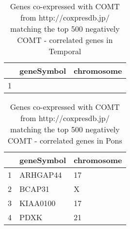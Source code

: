 \documentclass[letterpaper,12pt]{article}
\numberwithin{equation}{appendix}
\begin{document}
{{\clearpage
\begin{table}[ht]
\centering
\begin{tabular}{rll}
  \hline
 & geneSymbol & chromosome \\ 
  \hline
1 &  &  \\ 
   \hline
\end{tabular}
\caption{Genes co-expressed with COMT from http://coxpresdb.jp/ matching the top 500 negatively COMT - correlated genes in Temporal} 
\end{table}

\clearpage
\begin{table}[ht]
\centering
\begin{tabular}{rll}
  \hline
 & geneSymbol & chromosome \\ 
  \hline
1 & ARHGAP44 & 17 \\ 
  2 & BCAP31 & X \\ 
  3 & KIAA0100 & 17 \\ 
  4 & PDXK & 21 \\ 
   \hline
\end{tabular}
\caption{Genes co-expressed with COMT from http://coxpresdb.jp/ matching the top 500 negatively COMT - correlated genes in Pons} 
\end{table}

}}
\end{document}
